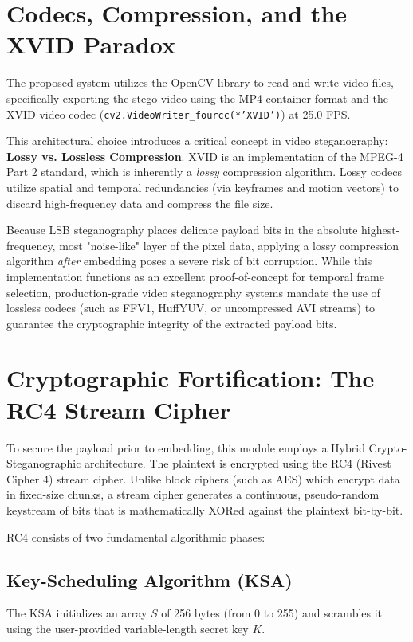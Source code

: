 \documentclass[12pt,a4paper]{report}
\begin{document}
\section{Codecs, Compression, and the XVID Paradox}
The proposed system utilizes the OpenCV library to read and write video files, specifically exporting the stego-video using the MP4 container format and the XVID video codec (\texttt{cv2.VideoWriter\_fourcc(*'XVID')}) at 25.0 FPS.

This architectural choice introduces a critical concept in video steganography: \textbf{Lossy vs. Lossless Compression}. 
XVID is an implementation of the MPEG-4 Part 2 standard, which is inherently a \textit{lossy} compression algorithm. Lossy codecs utilize spatial and temporal redundancies (via keyframes and motion vectors) to discard high-frequency data and compress the file size. 

Because LSB steganography places delicate payload bits in the absolute highest-frequency, most "noise-like" layer of the pixel data, applying a lossy compression algorithm \textit{after} embedding poses a severe risk of bit corruption. While this implementation functions as an excellent proof-of-concept for temporal frame selection, production-grade video steganography systems mandate the use of lossless codecs (such as FFV1, HuffYUV, or uncompressed AVI streams) to guarantee the cryptographic integrity of the extracted payload bits.

\section{Cryptographic Fortification: The RC4 Stream Cipher}
To secure the payload prior to embedding, this module employs a Hybrid Crypto-Steganographic architecture. The plaintext is encrypted using the RC4 (Rivest Cipher 4) stream cipher. Unlike block ciphers (such as AES) which encrypt data in fixed-size chunks, a stream cipher generates a continuous, pseudo-random keystream of bits that is mathematically XORed against the plaintext bit-by-bit.

RC4 consists of two fundamental algorithmic phases:

\subsection{Key-Scheduling Algorithm (KSA)}
The KSA initializes an array $S$ of 256 bytes (from 0 to 255) and scrambles it using the user-provided variable-length secret key $K$.
\end{document}
